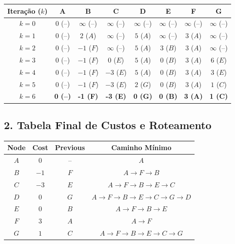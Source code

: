 \documentclass[11pt, a4paper]{article}
\begin{document}
\begin{center}
\begin{tabular}{cccccccc}
\toprule
\textbf{Iteração ($k$)} & \textbf{A} & \textbf{B} & \textbf{C} & \textbf{D} & \textbf{E} & \textbf{F} & \textbf{G} \\
\midrule
$k = 0$ & $0$ (--) & $\infty$ (--) & $\infty$ (--) & $\infty$ (--) & $\infty$ (--) & $\infty$ (--) & $\infty$ (--) \\
$k = 1$ & $0$ (--) & $2$ ($A$) & $\infty$ (--) & $5$ ($A$) & $\infty$ (--) & $3$ ($A$) & $\infty$ (--) \\
$k = 2$ & $0$ (--) & $-1$ ($F$) & $\infty$ (--) & $5$ ($A$) & $3$ ($B$) & $3$ ($A$) & $\infty$ (--) \\
$k = 3$ & $0$ (--) & $-1$ ($F$) & $0$ ($E$) & $5$ ($A$) & $0$ ($B$) & $3$ ($A$) & $6$ ($E$) \\
$k = 4$ & $0$ (--) & $-1$ ($F$) & $-3$ ($E$) & $5$ ($A$) & $0$ ($B$) & $3$ ($A$) & $3$ ($E$) \\
$k = 5$ & $0$ (--) & $-1$ ($F$) & $-3$ ($E$) & $2$ ($G$) & $0$ ($B$) & $3$ ($A$) & $1$ ($C$) \\
$k = 6$ & \textbf{0 (--)} & \textbf{-1 (F)} & \textbf{-3 (E)} & \textbf{0 (G)} & \textbf{0 (B)} & \textbf{3 (A)} & \textbf{1 (C)} \\
\bottomrule
\end{tabular}
\end{center}

\subsection*{2. Tabela Final de Custos e Roteamento}

\begin{center}
\begin{tabular}{cccc}
\toprule
\textbf{Node} & \textbf{Cost} & \textbf{Previous} & \textbf{Caminho Mínimo} \\
\midrule
$A$ & $0$ & -- & $A$ \\
$B$ & $-1$ & $F$ & $A \to F \to B$ \\
$C$ & $-3$ & $E$ & $A \to F \to B \to E \to C$ \\
$D$ & $0$ & $G$ & $A \to F \to B \to E \to C \to G \to D$ \\
$E$ & $0$ & $B$ & $A \to F \to B \to E$ \\
$F$ & $3$ & $A$ & $A \to F$ \\
$G$ & $1$ & $C$ & $A \to F \to B \to E \to C \to G$ \\
\bottomrule
\end{tabular}
\end{center}
\end{document}
